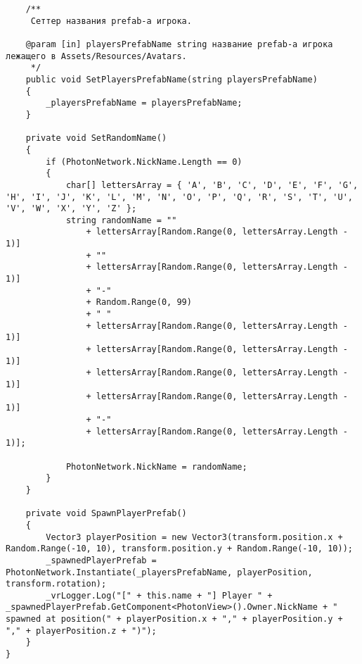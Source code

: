 \begin{verbatim}
    /**
     Сеттер названия prefab-а игрока.

    @param [in] playersPrefabName string название prefab-а игрока лежащего в Assets/Resources/Avatars. 
     */
    public void SetPlayersPrefabName(string playersPrefabName)
    {
        _playersPrefabName = playersPrefabName;
    }

    private void SetRandomName()
    {
        if (PhotonNetwork.NickName.Length == 0)
        {
            char[] lettersArray = { 'A', 'B', 'C', 'D', 'E', 'F', 'G', 'H', 'I', 'J', 'K', 'L', 'M', 'N', 'O', 'P', 'Q', 'R', 'S', 'T', 'U', 'V', 'W', 'X', 'Y', 'Z' };
            string randomName = ""
                + lettersArray[Random.Range(0, lettersArray.Length - 1)]
                + ""
                + lettersArray[Random.Range(0, lettersArray.Length - 1)]
                + "-"
                + Random.Range(0, 99)
                + " "
                + lettersArray[Random.Range(0, lettersArray.Length - 1)]
                + lettersArray[Random.Range(0, lettersArray.Length - 1)]
                + lettersArray[Random.Range(0, lettersArray.Length - 1)]
                + lettersArray[Random.Range(0, lettersArray.Length - 1)]
                + "-"
                + lettersArray[Random.Range(0, lettersArray.Length - 1)];

            PhotonNetwork.NickName = randomName;
        }
    }

    private void SpawnPlayerPrefab()
    {
        Vector3 playerPosition = new Vector3(transform.position.x + Random.Range(-10, 10), transform.position.y + Random.Range(-10, 10));
        _spawnedPlayerPrefab = PhotonNetwork.Instantiate(_playersPrefabName, playerPosition, transform.rotation);
        _vrLogger.Log("[" + this.name + "] Player " + _spawnedPlayerPrefab.GetComponent<PhotonView>().Owner.NickName + " spawned at position(" + playerPosition.x + "," + playerPosition.y + "," + playerPosition.z + ")");
    }
}

\end{verbatim}
